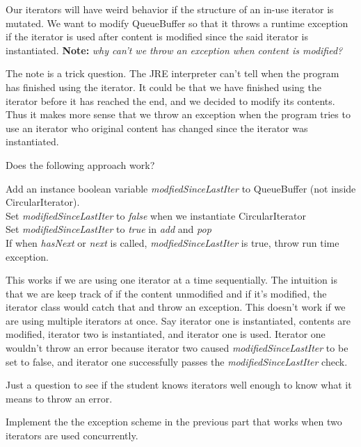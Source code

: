 \question Our iterators will have weird behavior if the structure of an in-use iterator is mutated. We want to modify QueueBuffer so that it throws a runtime exception if the iterator is used after content is modified since the said iterator is instantiated. \textbf{Note:} \emph{why can't we throw an exception when content is modified?}
\begin{solution}
The note is a trick question. The JRE interpreter can't tell when the program has finished using the iterator. It could be that we have finished using the iterator before it has reached the end, and we decided to modify its contents. Thus it makes more sense that we throw an exception when the program tries to use an iterator who original content has changed since the iterator was instantiated.
\end{solution}

Does the following approach work?

Add an instance boolean variable \emph{modfiedSinceLastIter} to QueueBuffer (not inside CircularIterator).\\
Set \emph{modifiedSinceLastIter} to \emph{false} when we instantiate CircularIterator\\
Set \emph{modifiedSinceLastIter} to \emph{true} in \emph{add} and \emph{pop}\\
If when \emph{hasNext} or \emph{next} is called, \emph{modfiedSinceLastIter} is true, throw run time exception.

\begin{solution}
This works if we are using one iterator at a time sequentially. The intuition is that we are keep track of if the content unmodified and if it's modified, the iterator class would catch that and throw an exception. This doesn't work if we are using multiple iterators at once. Say iterator one is instantiated, contents are modified, iterator two is instantiated, and iterator one is used. Iterator one wouldn't throw an error because iterator two caused  \emph{modifiedSinceLastIter} to be set to false, and iterator one successfully passes the \emph{modifiedSinceLastIter} check.
\end{solution}

\begin{meta}
Just a question to see if the student knows iterators well enough to know what it means to throw an error.
\end{meta}

\question Implement the the exception scheme in the previous part that works when two iterators are used concurrently.

